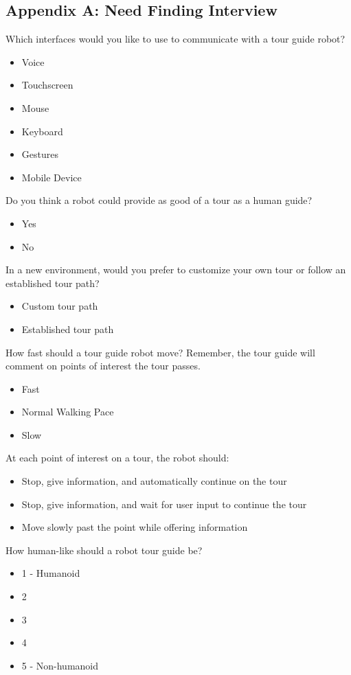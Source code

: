 \documentclass[11pt]{report}
\begin{document}
\subsection{Appendix A: Need Finding Interview}
\label{appendix:A}
Which interfaces would you like to use to communicate with a tour guide robot?
\begin{itemize}
 \item Voice
 \item Touchscreen
 \item Mouse
 \item Keyboard
 \item Gestures
 \item Mobile Device
\end{itemize}

Do you think a robot could provide as good of a tour as a human guide?
\begin{itemize}
 \item Yes
 \item No
\end{itemize}

In a new environment, would you prefer to customize your own tour or follow an established tour path? 
\begin{itemize}
 \item  Custom tour path
 \item Established tour path
\end{itemize}

How fast should a tour guide robot move? Remember, the tour guide will comment on points of interest the tour passes.
\begin{itemize}
 \item  Fast
 \item Normal Walking Pace
 \item Slow
\end{itemize}

At each point of interest on a tour, the robot should:
\begin{itemize}
 \item Stop, give information, and automatically continue on the tour
 \item Stop, give information, and wait for user input to continue the tour
 \item Move slowly past the point while offering information
\end{itemize}

How human-like should a robot tour guide be? 
\begin{itemize}
 \item 1 - Humanoid
 \item 2
 \item 3
 \item 4
 \item 5 - Non-humanoid
\end{itemize}
\end{document}
